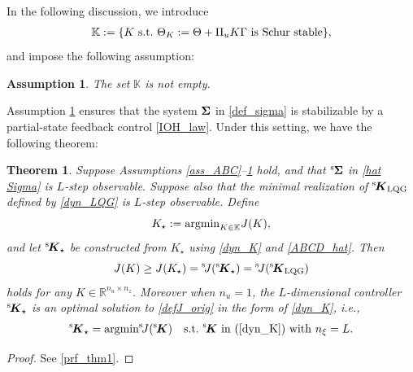 \documentclass[preprint,5p,times,twocolumn]{elsarticle}
\newcommand{\bm}[1]{{\mbox{\boldmath $#1$}}}
\newtheorem{assumption}{Assumption}
\newtheorem{theo}{Theorem}
\def\rms{{}^{\rm s}\hspace{-0.2mm}}
\def\rmsK{{}^{\rm s}\hspace{-0.4mm}}
\def\rmsJ{{}^{\rm s}\hspace{-0.5mm}}
\begin{document}
In the following discussion, we introduce
\begin{align}
    \mathbb K := \{K~{\rm s.t.}~ \Theta_K := \Theta + \Pi_uK\Gamma~{\rm is~Schur~stable}\}, \label{def_thetaK}
\end{align}
and impose the following assumption:
\begin{assumption}\label{ass_noemp}
    The set $\mathbb K$ is not empty. 
\end{assumption}
Assumption \ref{ass_noemp} ensures that the system ${\bm \Sigma}$ in \eqref{def_sigma} is stabilizable by a partial-state feedback control \eqref{IOH_law}. Under this setting, we have the following theorem: 
\begin{theo}\label{opt_thm}
Suppose Assumptions \ref{ass_ABC}–\ref{ass_noemp} hold, and that $\rms {\bm \Sigma}$ in \eqref{hat Sigma} is $L$-step observable. Suppose also that the minimal realization of $\rmsK {\bm K}_{\rm LQG}$ defined by \eqref{dyn_LQG} is $L$-step observable. Define
\begin{equation}\label{defKstar}
 K_{\star} := {\rm argmin}_{K \in \mathbb K} J(K), 
\end{equation}
and let $\rmsK {\bm K}_{\star}$ be constructed from $K_{\star}$ using \eqref{dyn_K} and \eqref{ABCD_hat}. Then
\begin{equation}\label{opteq1}
J(K) \geq J(K_{\star}) = \rmsJ J(\rmsK {\bm K}_{\star}) = \rmsJ J(\rmsK {\bm K}_{\rm LQG})
\end{equation}
holds for any $K \in \mathbb R^{n_u \times n_z}$.
 Moreover when $n_u = 1$, the $L$-dimensional controller $\rmsK {\bm K}_{\star}$ is an optimal solution to \eqref{defJ_orig} in the form of \eqref{dyn_K}, i.e., 
\begin{align}
    \rmsK {\bm K}_{\star} = {\rm argmin}  \rmsJ J(\rmsK {\bm K})\quad {\rm s.t.}~ \rmsK {\bm K}~{\rm in}~(\ref{dyn_K})~{\rm with}~n_{\xi}=L. \label{opteq2}
\end{align}
\end{theo}
\begin{proof} 
See \ref{prf_thm1}. 
\end{proof}
\end{document}
